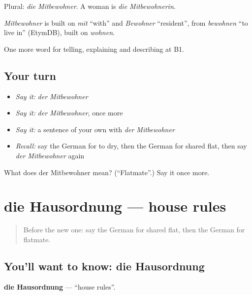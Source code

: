 Plural: \emph{die Mitbewohner}. A woman is \emph{die Mitbewohnerin}.

\begin{cousinweb}
\emph{Mitbewohner} is built on \emph{mit} \textquotedblleft{}with\textquotedblright{} and \emph{Bewohner} \textquotedblleft{}resident\textquotedblright{}, from \emph{bewohnen} \textquotedblleft{}to live in\textquotedblright{} (EtymDB), built on \emph{wohnen}.
\end{cousinweb}

\begin{grammarlens}[title={What you've built}]
One more word for telling, explaining and describing at B1.
\end{grammarlens}

\subsection*{Your turn}
\begin{itemize}
\raggedright
  \item \emph{Say it:} \emph{der Mitbewohner}
  \item \emph{Say it:} \emph{der Mitbewohner}, once more
  \item \emph{Say it:} a sentence of your own with \emph{der Mitbewohner}
  \item \emph{Recall:} say the German for to dry, then the German for shared flat, then say \emph{der Mitbewohner} again
\end{itemize}

\begin{tcolorbox}[breakable,colback=teal!4,colframe=teal!35!black,title={Before you move on}]
What does der Mitbewohner mean? (\textquotedblleft{}Flatmate\textquotedblright{}.) Say it once more.
\end{tcolorbox}
\section[die Hausordnung]{die Hausordnung — house rules}

\label{lesson:GE-C532-hausordnung}



\begin{quote}
Before the new one: say the German for shared flat, then the German for flatmate.
\end{quote}

\subsection*{You'll want to know: die Hausordnung}
\textbf{die Hausordnung} — \textquotedblleft{}house rules\textquotedblright{}.


